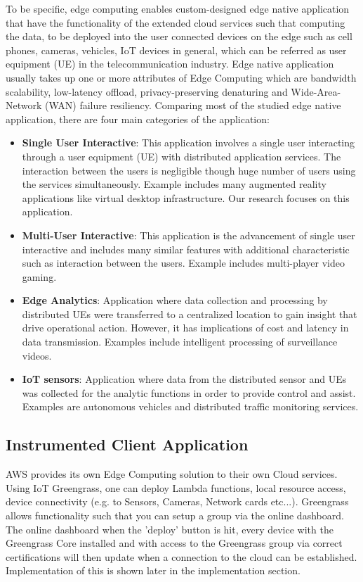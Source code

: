 To be specific, edge computing enables custom-designed edge native application that have the functionality of the extended cloud services such that computing the data, to be deployed into the user connected devices on the edge such as cell phones, cameras, vehicles, IoT devices in general, which can be referred as user equipment (UE) in the telecommunication industry. Edge native application usually takes up one or more attributes of Edge Computing which are bandwidth scalability, low-latency offload, privacy-preserving denaturing and Wide-Area-Network (WAN) failure resiliency. Comparing most of the studied edge native application, there are four main categories of the application:
\begin{itemize}
    \item \textbf{Single User Interactive}: This application involves a single user interacting through a user equipment (UE) with distributed application services. The interaction between the users is negligible though huge number of users using the services simultaneously. Example includes many augmented reality applications like virtual desktop infrastructure. Our research focuses on this application.
    \item \textbf{Multi-User Interactive}: This application is the advancement of single user interactive and includes many similar features with additional characteristic such as interaction between the users. Example includes multi-player video gaming. 
    \item \textbf{Edge Analytics}: Application where data collection and processing by distributed UEs were transferred to a centralized location to gain insight that drive operational action. However, it has implications of cost and latency in data transmission. Examples include intelligent processing of surveillance videos.
    \item \textbf{IoT sensors}: Application where data from the distributed sensor and UEs was collected for the analytic functions in order to provide control and assist. Examples are autonomous vehicles and distributed traffic monitoring services. 
\end{itemize}

\subsection{Instrumented Client Application}

AWS provides its own Edge Computing solution to their own Cloud services. Using IoT Greengrass, one can deploy Lambda functions, local resource access, device connectivity (e.g. to Sensors, Cameras, Network cards etc...). Greengrass allows functionality such that you can setup a group via the online dashboard. The online dashboard when the 'deploy' button is hit, every device with the Greengrass Core installed and with access to the Greengrass group via correct certifications will then update when a connection to the cloud can be established. Implementation of this is shown later in the implementation section.

